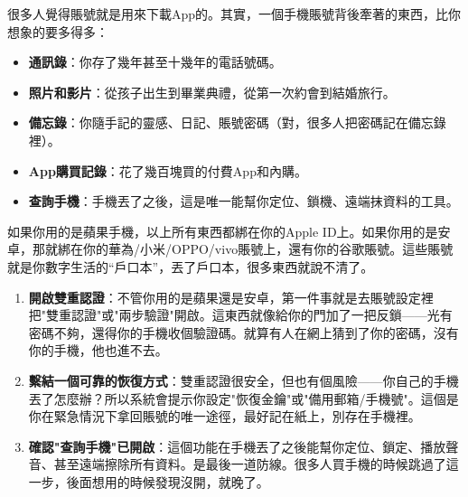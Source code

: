 


很多人覺得賬號就是用來下載App的。其實，一個手機賬號背後牽著的東西，比你想象的要多得多：

\begin{itemize}
  \item \textbf{通訊錄}：你存了幾年甚至十幾年的電話號碼。
  \item \textbf{照片和影片}：從孩子出生到畢業典禮，從第一次約會到結婚旅行。
  \item \textbf{備忘錄}：你隨手記的靈感、日記、賬號密碼（對，很多人把密碼記在備忘錄裡）。
  \item \textbf{App購買記錄}：花了幾百塊買的付費App和內購。
  \item \textbf{查詢手機}：手機丟了之後，這是唯一能幫你定位、鎖機、遠端抹資料的工具。
\end{itemize}

如果你用的是蘋果手機，以上所有東西都綁在你的Apple ID上。如果你用的是安卓，那就綁在你的華為/小米/OPPO/vivo賬號上，還有你的谷歌賬號。這些賬號就是你數字生活的“戶口本”，丟了戶口本，很多東西就說不清了。


\begin{enumerate}
  \item \textbf{開啟雙重認證}：不管你用的是蘋果還是安卓，第一件事就是去賬號設定裡把"雙重認證"或"兩步驗證"開啟。這東西就像給你的門加了一把反鎖——光有密碼不夠，還得你的手機收個驗證碼。就算有人在網上猜到了你的密碼，沒有你的手機，他也進不去。
  \item \textbf{繫結一個可靠的恢復方式}：雙重認證很安全，但也有個風險——你自己的手機丟了怎麼辦？所以系統會提示你設定"恢復金鑰"或"備用郵箱/手機號"。這個是你在緊急情況下拿回賬號的唯一途徑，最好記在紙上，別存在手機裡。
  \item \textbf{確認"查詢手機"已開啟}：這個功能在手機丟了之後能幫你定位、鎖定、播放聲音、甚至遠端擦除所有資料。是最後一道防線。很多人買手機的時候跳過了這一步，後面想用的時候發現沒開，就晚了。
\end{enumerate}


